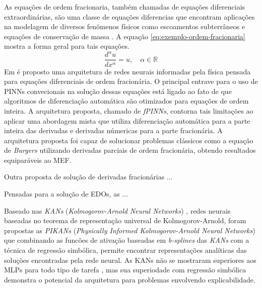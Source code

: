 As equações de ordem fracionaria, também chamadas de equações diferenciais 
extraordinárias, são uma classe de equações diferencias que encontram aplicações 
na modelagem de diversos fenõmenos físicos como escoamentos subterrâneos 
\cite{atangana-2013-fluxo-ordem-fracionaria} e equações de conservação de massa
\cite{wheatcraft-2008-conservacao-de-massa-fracionaria}. 
A equação \ref{eq:exemplo-ordem-fracionaria} mostra a forma geral para tais equações.
\begin{equation}\label{eq:exemplo-ordem-fracionaria}
    \dfrac{d^{\alpha}u}{dx^{\alpha}} = u, \quad \alpha \in \mathbb{R}
\end{equation}
Em \cite{pang-etal:2019-fPINNs} é proposto uma arquitetura de redes neurais 
informadas pela física pensada para equações diferenciais de ordem fracionária.
O principal entrave para o uso de PINNs convecionais na solução dessas equações
está ligado ao fato de que algoritmos de diferenciação automática são otimizados
para equações de ordem inteira.
A arquitetura proposta, chamado de \textit{fPINNs}, contorna tais limitações ao
aplicar uma abordagem mista que utiliza diferenciação automática para a parte inteira
das derivadas e derivadas númericas para a parte fracionária.
A arquitetura proposta foi capaz de solucionar problemas clássicos como a equação de 
\textit{Burgers} utilizando derivadas parciais de ordem fracionária, obtendo
resultados equiparáveis ao MEF.

Outra proposta de solução de derivadas fracionárias \cite{wang:2022-time-fractional-pinns}...

Pensadas para a solução de EDOs, as \cite{belbuteperes:2021-hyperpinns}...

Baseado nas \textit{KANs} (\textit{Kolmogorov-Arnold Neural Networks})
\cite{liu-etal:2025-kans}, redes neurais baseadas no teorema de representação 
universal de Kolmogorov-Arnold, foram propostas as \textit{PIKANs} 
(\textit{Physically Informed Kolmogorov-Arnold Neural Networks})
que combinando as funcões de ativação baseadas em \textit{b-splines} das
\textit{KANs} com a técnica de regressão simbólica, permite encontrar  
representações analíticas das soluções encontradas pela rede neural.
As KANs não se mostraram superiores aos MLPs para todo tipo de tarefa 
\cite{toscano:2025-pinns-para-pikans}, mas sua superiodade com regressão simbólica
demonstra o potencial da arquitetura para problemas envolvendo explicabilidade.

